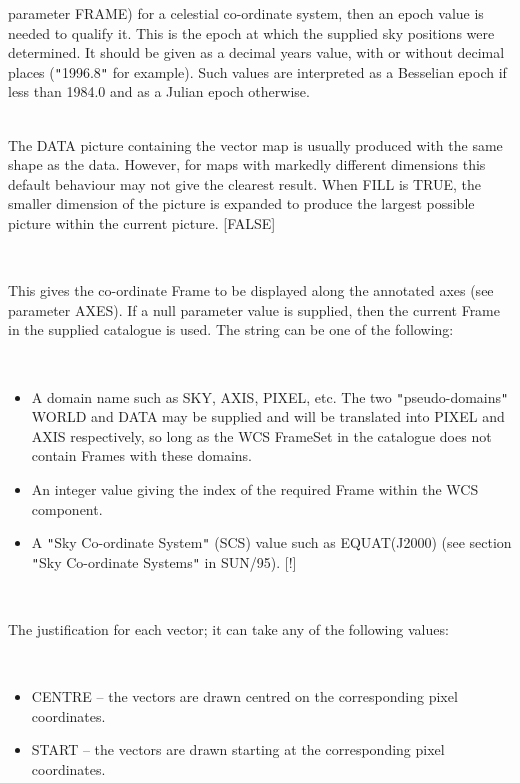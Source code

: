 \documentclass[twoside,11pt]{article}
\renewcommand{\_}{\texttt{\symbol{95}}}
\newcommand{\sstsubsection}[1]{ \item[{#1}] \mbox{} \\}
\newcommand{\sstitemlist}[1]{
  \mbox{} \\
  \vspace{-3.5ex}
  \begin{itemize}
     #1
  \end{itemize}
}
\newcommand{\sstitem}{\item}
\newcommand{\sstsubsection}[1]{\item[{#1}]}
\newcommand{\sstitemlist}[1]{
      \begin{itemize}
         #1
      \end{itemize}
      \\
   }
\newcommand{\sstitem}{\item}
\begin{document}
{{{         parameter FRAME) for a celestial co-ordinate system, then an epoch
         value is needed to qualify it. This is the epoch at which the
         supplied sky positions were determined. It should be given as a
         decimal years value, with or without decimal places  ({\tt "}1996.8{\tt "} for
         example). Such values are interpreted as a Besselian epoch if less
         than 1984.0 and as a Julian epoch otherwise.
      }
      \sstsubsection{
         FILL = \_LOGICAL (Read)
      }{
         The DATA picture containing the vector map is usually produced with
         the same shape as the data. However, for maps with markedly different
         dimensions this default behaviour may not give the clearest result.
         When FILL is TRUE, the smaller dimension of the picture is expanded
         to produce the largest possible picture within the current picture.
         [FALSE]
      }
      \sstsubsection{
         FRAME = LITERAL (Read)
      }{
         This gives the co-ordinate Frame to be displayed along the annotated
         axes (see parameter AXES). If a null parameter value is supplied,
         then the current Frame in the supplied catalogue is used. The
         string can be one of the following:
         \sstitemlist{

            \sstitem
            A domain name such as SKY, AXIS, PIXEL, etc. The two
            {\tt "}pseudo-domains{\tt "} WORLD and DATA may be supplied and will be
            translated into PIXEL and AXIS respectively, so long as the WCS
            FrameSet in the catalogue does not contain Frames with these domains.

            \sstitem
            An integer value giving the index of the required Frame within
            the WCS component.

            \sstitem
            A {\tt "}Sky Co-ordinate System{\tt "} (SCS) value such as EQUAT(J2000) (see
            section {\tt "}Sky Co-ordinate Systems{\tt "} in SUN/95). [!]
         }
      }
      \sstsubsection{
         JUST = LITERAL (Read)
      }{
         The justification for each vector; it can take any of the
         following values:
         \sstitemlist{

            \sstitem
               CENTRE -- the vectors are drawn centred on the
               corresponding pixel coordinates.

            \sstitem
               START -- the vectors are drawn starting at the
               corresponding pixel coordinates.

}}}}
\end{document}
